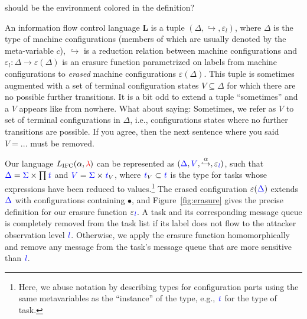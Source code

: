 \documentclass{sigplanconf}
\newcommand{\Varid}[1]{\mathit{#1}}
\newcommand{\Red}[1]{{\color{red} #1}}
\begin{document}
\Red{should be the environment colored in the definition?}
\begin{definition}
    An information flow control language \ensuremath{\textbf{L}} is a tuple \ensuremath{(\Delta,\hookrightarrow,\varepsilon_{\Varid{l}})}, where $\ensuremath{\Delta}$ is the type of machine configurations (members
    of which are usually denoted by the meta-variable \ensuremath{c}), \ensuremath{\hookrightarrow} is a
    reduction relation between machine configurations and \ensuremath{\varepsilon_{\Varid{l}}\mathbin{:}\Delta\rightarrow\varepsilon(\Delta)}
    is an erasure function parametrized on labels from machine configurations to \emph{erased} machine
    configurations \ensuremath{\varepsilon(\Delta)}.  This tuple is sometimes
    augmented with a set of terminal configuration states $V
    \subseteq \ensuremath{\Delta}$ for which there are no possible further transitions.
    \Red{It is a bit odd to extend a tuple ``sometimes'' and a \ensuremath{V} appears like from
      nowhere. What about saying: Sometimes, we refer as \ensuremath{V} to set of 
     terminal configurations in \ensuremath{\Delta}, i.e., configurations states where
     no further transitions are possible. If you agree, then the next sentence
     where you said \ensuremath{V\mathrel{=}\mathbin{...}} must be removed.}
\end{definition}

Our language \ensuremath{L_\text{IFC}(\alpha,\Red{\lambda}\;\!\!)} can be
represented as \ensuremath{(\ifc{\Delta},\ifc{V},\overset{\alpha}{\hookrightarrow},\varepsilon_{\ifc{\Varid{l}}})}, such that
$\ensuremath{\ifc{\Delta}} = \ensuremath{\ifc{\Sigma}} \times \prod \ensuremath{\ifc{\Varid{t}}}$ and
$\ensuremath{\ifc{V}} = \ensuremath{\ifc{\Sigma}} \times \ensuremath{\ifc{\Varid{t}}}_V$, where $\ensuremath{\ifc{\Varid{t}}}_V \subset \ensuremath{\ifc{\Varid{t}}}$ is the
type for tasks whose expressions have been reduced to
values.\footnote{
  Here, we abuse notation by describing types for configuration parts using the
  same metavariables as the ``instance'' of the type, e.g., \ensuremath{\ifc{\Varid{t}}} for the type of
  task.
}
The erased configuration \ensuremath{\varepsilon(\ifc{\Delta})} extends \ensuremath{\ifc{\Delta}} with configurations
containing \ensuremath{\bullet}, and Figure~\ref{fig:erasure} gives the precise definition for
our erasure function \ensuremath{\varepsilon_{\ifc{\Varid{l}}}}.
%
A task and its corresponding message queue is completely removed from the task
list if its label does not flow to the attacker observation level \ensuremath{\ifc{\Varid{l}}}.
Otherwise, we apply the erasure function homomorphically and remove any message
from the task's message queue that are more sensitive than \ensuremath{\ifc{\Varid{l}}}.
\end{document}

